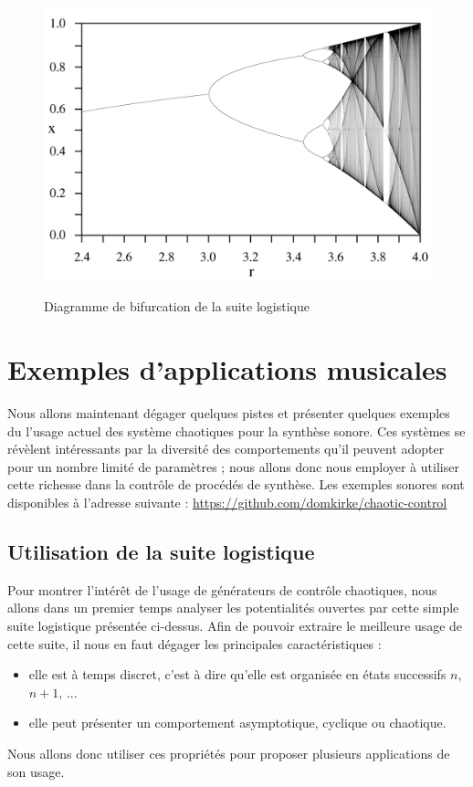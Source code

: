\documentclass[12pt,a4paper]{article}
\begin{document}
\begin{figure}
\begin{center}
\label{bifurcation}
\includegraphics[scale=0.15]{medias/logistic_bifurcation.png}
\caption{Diagramme de bifurcation de la suite logistique}
\end{center}
\end{figure}



\section{Exemples d'applications musicales}
Nous allons maintenant dégager quelques pistes et présenter quelques exemples du l'usage actuel des système chaotiques pour la synthèse sonore. Ces systèmes se révèlent intéressants par la diversité des comportements qu'il peuvent adopter pour un nombre limité de paramètres ; nous allons donc nous employer à utiliser cette richesse dans la contrôle de procédés de synthèse. Les exemples sonores sont disponibles à l'adresse suivante : \url{https://github.com/domkirke/chaotic-control}

\subsection{Utilisation de la suite logistique}
Pour montrer l'intérêt de l'usage de générateurs de contrôle chaotiques, nous allons dans un premier temps analyser les potentialités ouvertes par cette simple suite logistique présentée ci-dessus. Afin de pouvoir extraire le meilleure usage de cette suite, il nous en faut dégager les principales caractéristiques :
\begin{itemize}
\item elle est à temps discret, c'est à dire qu'elle est organisée en états successifs $n$, $n+1$, ...
\item elle peut présenter un comportement asymptotique, cyclique ou chaotique.
\end{itemize}
Nous allons donc utiliser ces propriétés pour proposer plusieurs applications de son usage.
\end{document}
